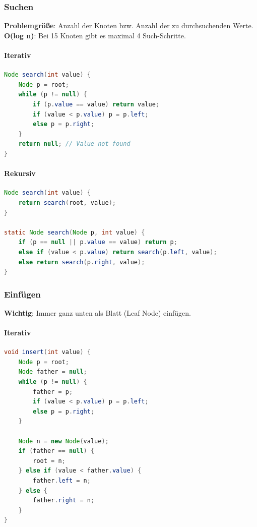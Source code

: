 \documentclass{article}
\begin{document}
\subsubsection{Suchen}

{\bf Problemgröße}: Anzahl der Knoten bzw. Anzahl der zu durchsuchenden Werte. \\ {\bf O(log n)}: Bei 15 Knoten gibt es maximal 4 Such-Schritte.

\paragraph{Iterativ}

\begin{lstlisting}[language=java, tabsize=4]
Node search(int value) {
    Node p = root;
    while (p != null) {
        if (p.value == value) return value;
        if (value < p.value) p = p.left;
        else p = p.right;
    }
    return null; // Value not found
}
\end{lstlisting}

\paragraph{Rekursiv}

\begin{lstlisting}[language=java, tabsize=4]
Node search(int value) {
    return search(root, value);
}

static Node search(Node p, int value) {
    if (p == null || p.value == value) return p;
    else if (value < p.value) return search(p.left, value);
    else return search(p.right, value);
}
\end{lstlisting}

\subsubsection{Einfügen}

{\bf Wichtig}: Immer ganz unten als Blatt (Leaf Node) einfügen.

\paragraph{Iterativ}

\begin{lstlisting}[language=java, tabsize=4]
void insert(int value) {
    Node p = root;
    Node father = null;
    while (p != null) {
        father = p;
        if (value < p.value) p = p.left;
        else p = p.right;
    }
    
    Node n = new Node(value);
    if (father == null) {
        root = n;
    } else if (value < father.value) {
        father.left = n;
    } else {
        father.right = n;
    }
}
\end{lstlisting}
\end{document}
